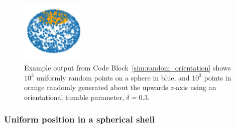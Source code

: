 \documentclass[
  9pt,
  bestpractices,
]{livecoms}
\begin{document}
\begin{figure}

\end{figure}

\begin{figure}

\end{figure}

\begin{figure}

\end{figure}

\begin{figure}

\end{figure}

\begin{figure}
\begin{centering}
\includegraphics[width=3cm]{../codes/random_orientation.png}
\caption{
Example output from Code Block~\ref{sim:random_orientation} shows $10^3$ uniformly random points on a sphere in blue, and $10^3$ points in orange randomly generated about the upwards $z$-axis using an orientational tunable parameter, $\delta=0.3$.
\label{fig:orientation_perturbation}
}
\end{centering}
\end{figure}

\subsubsection{\label{sec:spherical_shell}Uniform position in a spherical shell}
\end{document}
